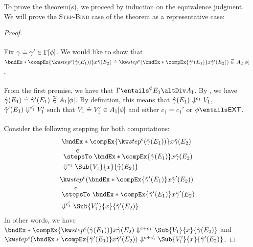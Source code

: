 \documentclass[letterpaper]{article}
\newcommand{\EXT}{\textsf{EXT}}
\newcommand{\gyat}{\hat{\gamma}}
\begin{document}
To prove the theorem(s), we proceed by induction on the equivalence judgment. We will prove the \textsc{Step-Bind} case of the theorem as a representative case:
\begin{proof}\phantom{nextline}\\\\
    Fix $\gamma\mathrel{\doteq}\gamma' \in \Gamma [\phi]$.
    We would like to show that\\ $\compEqOfPhase{\bndEx*{\compEx{\stepEx{c}{\gyat(E_1)}}}{x}{\gyat(E_2)}}{\stepEx{c}{\bndEx*{\compEx{\gyat'(E_1)}}{x}{\gyat'(E_2)}}}{A_2}{\phi}$.\\\\
    From the first premise, we have that $\Gamma \entailsPhase{\phi} E_1 \altDiv A_1$. By , 
    we have $\compEqOfPhase{\gyat(E_1)}{\gyat'(E_1)}{A_1}{\phi}$. By definition, this means that $\gyat(E_1) \evalsToC{c_1} V_1$, $\gyat'(E_1) \evalsToC{c_1'} V_1'$ such that $V_1\mathrel{\doteq}V_1' \in A_1 [\phi]$
    and either $c_1 = c_1'$ or $\phi \entails \EXT$.\\\\
    Consider the following stepping for both computations:
    \begin{align*}
        &\bndEx*{\compEx{\stepEx{c}{\gyat(E_1)}}}{x}{\gyat(E_2)}\\
        &\stepsToC{c} \bndEx*{\compEx{\gyat(E_1)}}{x}{\gyat(E_2)}\\
        &\evalsToC{c_1} \Sub{V_1}{x}{\gyat(E_2)}
    \end{align*}
    \begin{align*}
        &\stepEx{c}{\bndEx*{\compEx{\gyat'(E_1)}}{x}{\gyat'(E_2)}}\\
        &\stepsToC{c} \bndEx*{\compEx{\gyat'(E_1)}}{x}{\gyat'(E_2)}\\
        &\evalsToC{c_1'} \Sub{V_1'}{x}{\gyat'(E_2)}
    \end{align*}
    In other words, we have $\bndEx*{\compEx{\stepEx{c}{\gyat(E_1)}}}{x}{\gyat(E_2)} \evalsToC{c+c_1} \Sub{V_1}{x}{\gyat(E_2)}$ and $\stepEx{c}{\bndEx*{\compEx{\gyat'(E_1)}}{x}{\gyat'(E_2)}} \evalsToC{c+c_1'} \Sub{V_1'}{x}{\gyat'(E_2)}$.


\end{proof}
\end{document}

